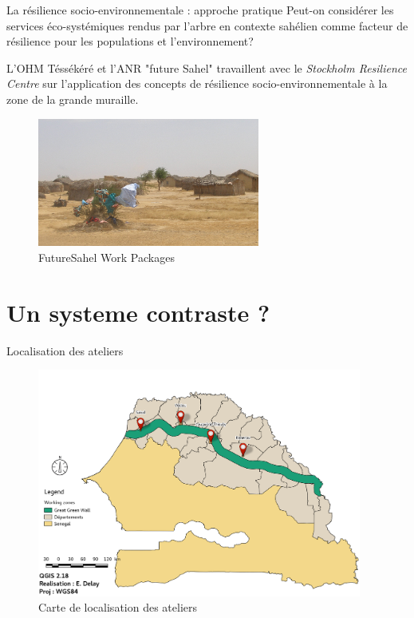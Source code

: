\documentclass[newPxFont]{beamer}
\begin{document}
\begin{frame}[c]{La résilience socio-environnementale : approche pratique}
\vspace{-1cm}
Peut-on considérer les services éco-systémiques rendus par l'arbre en contexte sahélien comme
facteur de résilience pour les populations et l'environnement?

L'OHM Téssékéré et l'ANR "future Sahel" travaillent avec le \textit{Stockholm Resilience Centre} sur l'application des concepts de résilience socio-environnementale à la zone de la grande muraille.

\begin{figure}
	\centering
	\includegraphics[width = 0.65\textwidth]{img/PA310152.JPG}
	\caption{FutureSahel Work Packages}
\end{figure}
\end{frame}

\section{Un systeme contraste ?}

\begin{frame}[c]{Localisation des ateliers}
\vspace{-1cm}

\begin{figure}
	\centering
	\includegraphics[height = 7.5cm]{img/localisation_map.png}
  \caption{Carte de localisation des ateliers}
\end{figure}
\end{frame}
\end{document}
